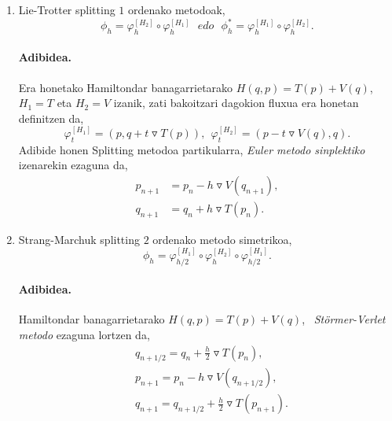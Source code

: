\begin{enumerate}

\item Lie-Trotter splitting $1$ ordenako metodoak,
\begin{equation}
\phi_h = \varphi_h^{[H_2]} \circ \varphi_h^{[H_1]} \ \ \ edo \ \ \ \phi_h^{*} = \varphi_h^{[H_1]} \circ \varphi_h^{[H_2]}.
\label{eq:LieT}
\end{equation}


\paragraph*{Adibidea.}

Era honetako Hamiltondar banagarrietarako $H(q,p)=T(p)+V(q)$, $H_1=T$ eta $H_2=V$ izanik, zati bakoitzari dagokion fluxua era honetan definitzen da,
\begin{equation*}
\varphi_t^{[H_1]}=(p,q+t\triangledown T(p)), \ \ \varphi_t^{[H_2]}=(p-t\triangledown V(q),q). 
\end{equation*}
Adibide honen Splitting metodoa partikularra, \emph{Euler metodo sinplektiko} izenarekin ezaguna da,
\begin{align*}
p_{n+1}&=p_{n}-h \triangledown V(q_{n+1}), \\
q_{n+1}&=q_{n}+h \triangledown T(p_n).
\end{align*}  
   

\item Strang-Marchuk splitting $2$ ordenako metodo simetrikoa,
\begin{equation}
\phi_h =  \varphi_{{h}/{2}}^{[H_1]} \circ \varphi_h^{[H_2]} \circ \varphi_{{h}/{2}}^{[H_1]}.
\end{equation} 

\paragraph*{Adibidea.}

Hamiltondar banagarrietarako $H(q,p)=T(p)+V(q)$, ~\emph{Störmer-Verlet metodo} ezaguna lortzen da,
\begin{align*}
&q_{{n+1}/{2}} =q_n+\frac{h}{2} \triangledown T(p_n), \\
&p_{n+1} =p_n-h \triangledown V(q_{{n+1}/{2}}), \\
&q_{n+1} =q_{{n+1}/{2}}+\frac{h}{2} \triangledown T(p_{n+1}).
\end{align*}

\end{enumerate}

